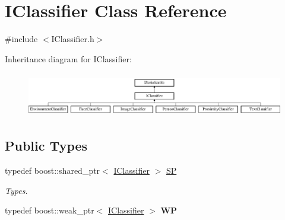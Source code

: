 \hypertarget{class_i_classifier}{}\section{I\+Classifier Class Reference}
\label{class_i_classifier}


{\ttfamily \#include $<$I\+Classifier.\+h$>$}

Inheritance diagram for I\+Classifier\+:\begin{figure}[H]
\begin{center}
\leavevmode
\includegraphics[height=1.958042cm]{class_i_classifier}
\end{center}
\end{figure}
\subsection*{Public Types}
\begin{DoxyCompactItemize}
\item 
\mbox{\label{class_i_classifier_a532d21507aef94011669a0b73bd49c2d}} 
typedef boost\+::shared\+\_\+ptr$<$ \hyperlink{class_i_classifier}{I\+Classifier} $>$ \hyperlink{class_i_classifier_a532d21507aef94011669a0b73bd49c2d}{SP}
\begin{DoxyCompactList}\small\item\em Types. \end{DoxyCompactList}\item 
\mbox{\label{class_i_classifier_aae20fb920d287fa048ca3603c950036f}} 
typedef boost\+::weak\+\_\+ptr$<$ \hyperlink{class_i_classifier}{I\+Classifier} $>$ {\bfseries WP}
\end{DoxyCompactItemize}
